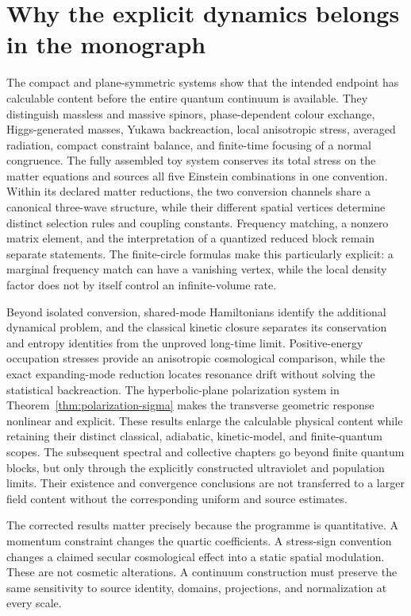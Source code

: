 \documentclass[11pt,a4paper,oneside]{book}
\theoremstyle{plain}
\theoremstyle{definition}
\theoremstyle{remark}
\begin{document}
\section{Why the explicit dynamics belongs in the monograph}
The compact and plane-symmetric systems show that the intended endpoint has calculable content before the entire quantum continuum is available. They distinguish massless and massive spinors, phase-dependent colour exchange, Higgs-generated masses, Yukawa backreaction, local anisotropic stress, averaged radiation, compact constraint balance, and finite-time focusing of a normal congruence. The fully assembled toy system conserves its total stress on the matter equations and sources all five Einstein combinations in one convention. Within its declared matter reductions, the two conversion channels share a canonical three-wave structure, while their different spatial vertices determine distinct selection rules and coupling constants. Frequency matching, a nonzero matrix element, and the interpretation of a quantized reduced block remain separate statements. The finite-circle formulas make this particularly explicit: a marginal frequency match can have a vanishing vertex, while the local density factor does not by itself control an infinite-volume rate.

Beyond isolated conversion, shared-mode Hamiltonians identify the
additional dynamical problem, and the classical kinetic closure separates
its conservation and entropy identities from the unproved long-time
limit.  Positive-energy occupation stresses provide an anisotropic
cosmological comparison, while the exact expanding-mode reduction locates
resonance drift without solving the statistical backreaction.  The
hyperbolic-plane polarization system in
Theorem~\ref{thm:polarization-sigma} makes the transverse geometric
response nonlinear and explicit.  These results enlarge the calculable
physical content while retaining their distinct classical, adiabatic,
kinetic-model, and finite-quantum scopes.  The subsequent spectral and
collective chapters go beyond finite quantum blocks, but only through
the explicitly constructed ultraviolet and population limits.  Their
existence and convergence conclusions are not transferred to a larger
field content without the corresponding uniform and source estimates.

The corrected results matter precisely because the programme is quantitative. A momentum constraint changes the quartic coefficients. A stress-sign convention changes a claimed secular cosmological effect into a static spatial modulation. These are not cosmetic alterations. A continuum construction must preserve the same sensitivity to source identity, domains, projections, and normalization at every scale.
\end{document}

